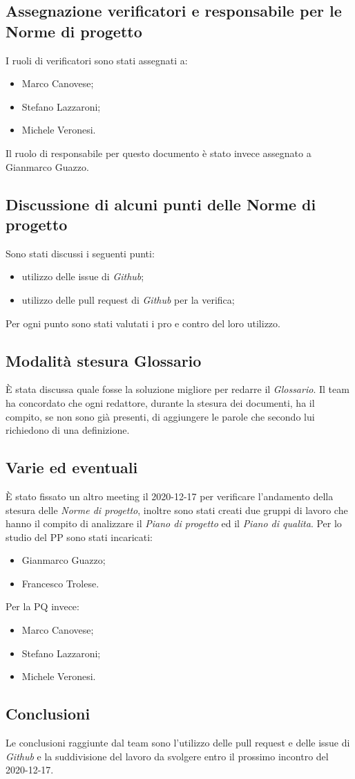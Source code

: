 	\subsection{Assegnazione verificatori e responsabile per le Norme di progetto}
	I ruoli di verificatori sono stati assegnati a:
	\begin{itemize}
		\item Marco Canovese;
		\item Stefano Lazzaroni;
		\item Michele Veronesi.
	\end{itemize}
	Il ruolo di responsabile per questo documento è stato invece assegnato a Gianmarco Guazzo.

	\subsection{Discussione di alcuni punti delle Norme di progetto}
	Sono stati discussi i seguenti punti:
	\begin{itemize}
		\item utilizzo delle issue di \textit{Github};
		\item utilizzo delle pull request di \textit{Github} per la verifica;
	\end{itemize}
	Per ogni punto sono stati valutati i pro e contro del loro utilizzo.

	\subsection{Modalità stesura Glossario}
	È stata discussa quale fosse la soluzione migliore per redarre il \textit{Glossario}. Il team ha concordato che ogni redattore, durante la stesura dei documenti, ha il compito, se non sono già presenti, di aggiungere le parole che secondo lui richiedono di una definizione.
	
	\subsection{Varie ed eventuali}
	È stato fissato un altro meeting il 2020-12-17 per verificare l'andamento della stesura delle \textit{Norme di progetto}, inoltre sono stati creati due gruppi di lavoro che hanno il compito di analizzare il \textit{Piano di progetto} ed il \textit{Piano di qualita}.
	Per lo studio del PP sono stati incaricati:
	\begin{itemize}
		\item Gianmarco Guazzo;
		\item Francesco Trolese.
	\end{itemize}
	Per la PQ invece:
	\begin{itemize}
		\item Marco Canovese;
		\item Stefano Lazzaroni;
		\item Michele Veronesi.
	\end{itemize}
	

	\subsection{Conclusioni}
	Le conclusioni raggiunte dal team sono l'utilizzo delle pull request e delle issue di \textit{Github} e la suddivisione del lavoro da svolgere entro il prossimo incontro del 2020-12-17.

	